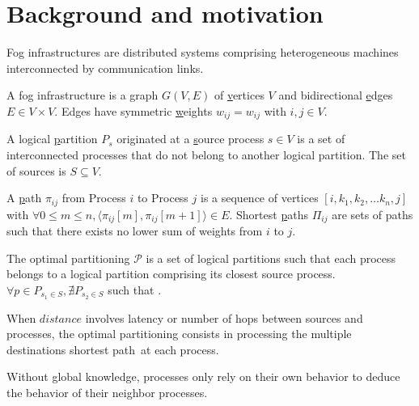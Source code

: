
\section{Background and motivation}
\label{sec:background}

Fog infrastructures are distributed systems comprising heterogeneous
machines interconnected by communication links.

\begin{definition}
  A fog infrastructure is a \underline{g}raph $G(V, E)$ of
  \underline{v}ertices $V$ and bidirectional \underline{e}dges $E \in
  V \times V$. Edges have symmetric \underline{w}eights $w_{ij} =
  w_{ij}$ with $i, j \in V$.
\end{definition}

\begin{definition}
  A logical \underline{p}artition $P_s$ originated at a
  \underline{s}ource process $s \in V$ is a set of interconnected
  processes that do not belong to another logical partition. The set
  of sources is $S \subseteq V$.
\end{definition}

\begin{definition}
  A \underline{p}ath $\pi_{ij}$ from Process $i$ to Process $j$ is a
  sequence of vertices $[i, k_1, k_2, \ldots k_n, j]$ with $\forall
  0\leq m \leq n, \langle \pi_{ij}[m], \pi_{ij}[m+1] \rangle \in
  E$. Shortest \underline{p}aths $\Pi_{ij}$ are sets of paths such
  that there exists no lower sum of weights from $i$ to $j$.
\end{definition}

\begin{definition}
  The optimal partitioning $\mathcal{P}$ is a set of logical
  partitions such that each process belongs to a logical partition
  comprising its closest source process. $\forall p \in P_{s_1\in S},
  \nexists P_{s_2 \in S}$ such that . 
\end{definition}

When $distance$ involves latency or number of hops between sources and
processes, the optimal partitioning consists in processing the
multiple destinations shortest path~\REF at each process.




Without global knowledge, processes only rely on their own behavior to
deduce the behavior of their neighbor processes. 

